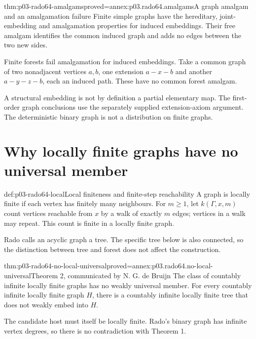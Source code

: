 \begin{hbtheorem}{thm:p03-rado64-amalgams}{proved=annex:p03.rado64.amalgams}{A graph amalgam and an amalgamation failure}
Finite simple graphs have the hereditary, joint-embedding and amalgamation
properties for induced embeddings. Their free amalgam identifies the common
induced graph and adds no edges between the two new sides.

Finite forests fail amalgamation for induced embeddings. Take a common graph
of two nonadjacent vertices \(a,b\), one extension \(a-x-b\) and another
\(a-y-z-b\), each an induced path. These have no common forest amalgam.
\end{hbtheorem}

A structural embedding is not by definition a partial elementary map.
The first-order graph conclusions use the separately supplied extension-axiom
argument. The deterministic binary graph is not a distribution on finite graphs.

\section{Why locally finite graphs have no universal member}
\label{sec:p03-rado64-locally-finite}

\begin{hbdefinition}{def:p03-rado64-local}{Local finiteness and finite-step reachability}
A graph is locally finite if each vertex has finitely many neighbours.
For \(m\geq1\), let \(k(\Gamma,x,m)\) count vertices reachable from \(x\)
by a walk of exactly \(m\) edges; vertices in a walk may repeat.
This count is finite in a locally finite graph.

Rado calls an acyclic graph a tree. The specific tree below is also connected,
so the distinction between tree and forest does not affect the construction.
\end{hbdefinition}

\begin{hbtheorem}{thm:p03-rado64-no-local-universal}{proved=annex:p03.rado64.no-local-universal}{Theorem 2, communicated by N. G. de Bruijn}
The class of countably infinite locally finite graphs has no weakly universal
member. For every countably infinite locally finite graph \(H\), there is
a countably infinite locally finite tree that does not weakly embed into \(H\).
\end{hbtheorem}

The candidate host must itself be locally finite. Rado's binary graph has
infinite vertex degrees, so there is no contradiction with Theorem 1.

